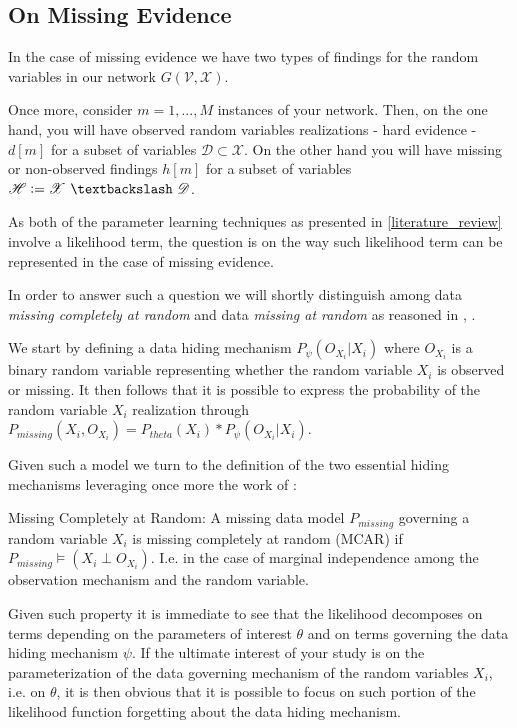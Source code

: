 \documentclass[11pt]{article}
\begin{document}
\begin{article}
\newpage

\section{On Missing Evidence}
\label{missing-learning}
In the case of missing evidence we have two types of findings for
the random variables in our network \(G(\mathscr{V}, \mathscr{X})\).

Once more, consider \(m = 1, ..., M\) instances of your network. Then,
on the one hand, you will have observed random variables
realizations - hard evidence - \(d[m]\) for a subset of variables
\(\mathscr{D} \subset \mathscr{X}\). On the other hand you will have
missing or non-observed findings \(h[m]\) for a subset of variables
\(\mathscr{H} \vcentcolon= \mathscr{X} \ \textbackslash \ \mathscr{D}\).

As both of the parameter learning techniques as presented in
\ref{literature_review} involve a likelihood term, the question is on
the way such likelihood term can be represented in the case of
missing evidence.

In order to answer such a question we will shortly distinguish among
data \emph{missing completely at random} and data \emph{missing at random} as
reasoned in \cite{little1976inference}, \cite{rubin1976inference}.

We start by defining a data hiding mechanism \(P_\psi(O_{X_i}|X_i)\) where
\(O_{X_i}\) is a binary random variable representing whether the
random variable \(X_i\) is observed or missing. It then follows that
it is possible to express the probability of the random variable
\(X_i\) realization through \(P_{missing}(X_i, O_{X_i}) = P_{theta}(X_i) *
  P_\psi(O_{X_i}|X_i)\).

Given such a model we turn to the definition of the two essential
hiding mechanisms leveraging once more the work of \cite{koller2009probabilistic}:

\begin{definition}
Missing Completely at Random: A missing data model $P_{missing}$ governing a
random variable $X_i$ is missing
completely at random (MCAR) if $P_{missing} \models (X_i \perp O_{X_i})$.
I.e. in the case of marginal independence among the observation mechanism
and the random variable.
\end{definition}  

Given such property it is immediate to see that the likelihood
decomposes on terms depending on the parameters of interest \(\theta\)
and on terms governing the data hiding mechanism \(\psi\). If the
ultimate interest of your study is on the parameterization of the
data governing mechanism of the random variables \(X_i\), i.e. on
\(\theta\), it is then obvious that it is possible to focus on such
portion of the likelihood function forgetting about the data hiding
mechanism.


\end{article}
\end{document}
